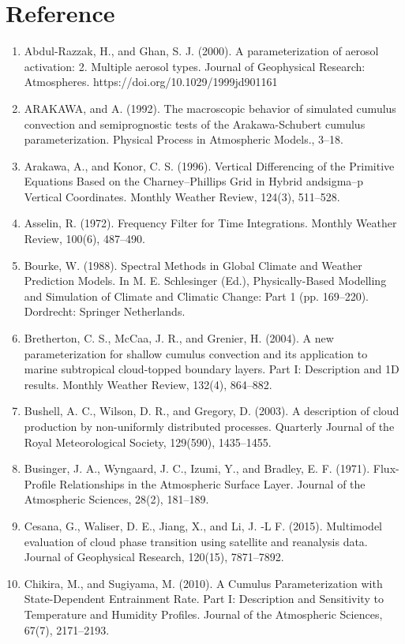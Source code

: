 \section{Reference}
\begin{enumerate}
\item Abdul-Razzak, H., and Ghan, S. J. (2000). A parameterization of aerosol activation: 2. Multiple aerosol types. Journal of Geophysical Research: Atmospheres. https://doi.org/10.1029/1999jd901161
\item ARAKAWA, and A. (1992). The macroscopic behavior of simulated cumulus convection and semiprognostic tests of the Arakawa-Schubert cumulus parameterization. Physical Process in Atmospheric Models., 3–18.
\item Arakawa, A., and Konor, C. S. (1996). Vertical Differencing of the Primitive Equations Based on the Charney–Phillips Grid in Hybrid andsigma–p Vertical Coordinates. Monthly Weather Review, 124(3), 511–528.
\item Asselin, R. (1972). Frequency Filter for Time Integrations. Monthly Weather Review, 100(6), 487–490.
\item Bourke, W. (1988). Spectral Methods in Global Climate and Weather Prediction Models. In M. E. Schlesinger (Ed.), Physically-Based Modelling and Simulation of Climate and Climatic Change: Part 1 (pp. 169–220). Dordrecht: Springer Netherlands.
\item Bretherton, C. S., McCaa, J. R., and Grenier, H. (2004). A new parameterization for shallow cumulus convection and its application to marine subtropical cloud-topped boundary layers. Part I: Description and 1D results. Monthly Weather Review, 132(4), 864–882.
\item Bushell, A. C., Wilson, D. R., and Gregory, D. (2003). A description of cloud production by non-uniformly distributed processes. Quarterly Journal of the Royal Meteorological Society, 129(590), 1435–1455.
\item Businger, J. A., Wyngaard, J. C., Izumi, Y., and Bradley, E. F. (1971). Flux-Profile Relationships in the Atmospheric Surface Layer. Journal of the Atmospheric Sciences, 28(2), 181–189.
\item Cesana, G., Waliser, D. E., Jiang, X., and Li, J. ‐L F. (2015). Multimodel evaluation of cloud phase transition using satellite and reanalysis data. Journal of Geophysical Research, 120(15), 7871–7892.
\item Chikira, M., and Sugiyama, M. (2010). A Cumulus Parameterization with State-Dependent Entrainment Rate. Part I: Description and Sensitivity to Temperature and Humidity Profiles. Journal of the Atmospheric Sciences, 67(7), 2171–2193.

\end{enumerate}
